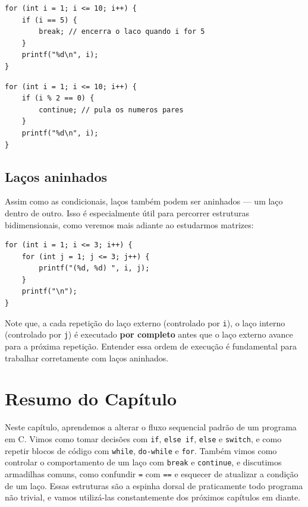 \begin{lstlisting}
for (int i = 1; i <= 10; i++) {
    if (i == 5) {
        break; // encerra o laco quando i for 5
    }
    printf("%d\n", i);
}
\end{lstlisting}

\begin{lstlisting}
for (int i = 1; i <= 10; i++) {
    if (i % 2 == 0) {
        continue; // pula os numeros pares
    }
    printf("%d\n", i);
}
\end{lstlisting}

\subsection{Laços aninhados}

Assim como as condicionais, laços também podem ser aninhados — um laço dentro de outro. Isso é especialmente útil para percorrer estruturas bidimensionais, como veremos mais adiante ao estudarmos matrizes:

\begin{lstlisting}
for (int i = 1; i <= 3; i++) {
    for (int j = 1; j <= 3; j++) {
        printf("(%d, %d) ", i, j);
    }
    printf("\n");
}
\end{lstlisting}

Note que, a cada repetição do laço externo (controlado por \texttt{i}), o laço interno (controlado por \texttt{j}) é executado \textbf{por completo} antes que o laço externo avance para a próxima repetição. Entender essa ordem de execução é fundamental para trabalhar corretamente com laços aninhados.

\section*{Resumo do Capítulo}
Neste capítulo, aprendemos a alterar o fluxo sequencial padrão de um programa em C. Vimos como tomar decisões com \texttt{if}, \texttt{else if}, \texttt{else} e \texttt{switch}, e como repetir blocos de código com \texttt{while}, \texttt{do-while} e \texttt{for}. Também vimos como controlar o comportamento de um laço com \texttt{break} e \texttt{continue}, e discutimos armadilhas comuns, como confundir \texttt{=} com \texttt{==} e esquecer de atualizar a condição de um laço. Essas estruturas são a espinha dorsal de praticamente todo programa não trivial, e vamos utilizá-las constantemente dos próximos capítulos em diante.

